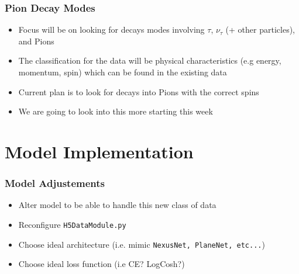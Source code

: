 \documentclass{beamer}
\begin{document}
\begin{frame}
\frametitle{Pion Decay Modes}
	\begin{itemize}
		\item Focus will be on looking for decays modes involving $\tau$, $\nu_{\tau}$ (+ other particles), and Pions
		\item The classification for the data will be physical characteristics (e.g energy, momentum, spin) which can be found in the existing data
		\item Current plan is to look for decays into Pions with the correct spins
		\item We are going to look into this more starting this week
	\end{itemize}
\end{frame}




\section{Model Implementation}

\begin{frame}
\frametitle{Model Adjustements}
	\begin{itemize}
		\item Alter model to be able to handle this new class of data

		\item Reconfigure \texttt{H5DataModule.py}
		\item Choose ideal architecture (i.e. mimic \texttt{NexusNet, PlaneNet, etc...})
		\item Choose ideal loss function (i.e CE? LogCosh?)
	\end{itemize}
\end{frame}
\end{document}
